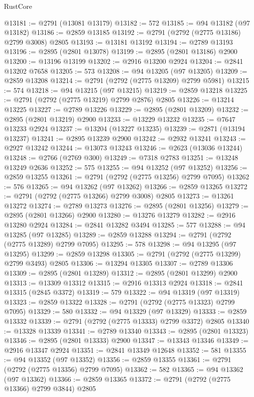 \begin{lexlean}{RustCore}
\begin{coremodule}
@13181 := @2791 (@13081 @13179)
@13182 := 572
@13185 := @94 @13182 (@97 @13182)
@13186 := @2859 @13185
@13192 := @2791 (@2792 (@2775 @13186) @2799 @3008) @2805
@13193 := @13181 @13192
@13194 := @2789 @13193
@13196 := @2895 (@2801 @13078)
@13199 := @2895 (@2801 @13186) @2900
@13200 := @13196 @13199
@13202 := @2916 @13200 @2924
@13204 := @2841 @13202 @7658
@13205 := 573
@13208 := @94 @13205 (@97 @13205)
@13209 := @2859 @13208
@13214 := @2791 (@2792 (@2775 @13209) @2799 @5981)
@13215 := 574
@13218 := @94 @13215 (@97 @13215)
@13219 := @2859 @13218
@13225 := @2791 (@2792 (@2775 @13219) @2799 @2876) @2805
@13226 := @13214 @13225
@13227 := @2789 @13226
@13229 := @2895 (@2801 @13209)
@13232 := @2895 (@2801 @13219) @2900
@13233 := @13229 @13232
@13235 := @7647 @13233 @2924
@13237 := @13204 (@13227 @13235)
@13239 := @2871 (@13194 @13237)
@13241 := @2895 @13239 @2900
@13242 := @2932 @13241
@13243 := @2927 @13242
@13244 := @13073 @13243
@13246 := @2623 (@13036 @13244)
@13248 := @2766 (@2769 @300)
@13249 := @7318 @2783
@13251 := @13248 @13249 @2636
@13252 := 575
@13255 := @94 @13252 (@97 @13252)
@13256 := @2859 @13255
@13261 := @2791 (@2792 (@2775 @13256) @2799 @7095)
@13262 := 576
@13265 := @94 @13262 (@97 @13262)
@13266 := @2859 @13265
@13272 := @2791 (@2792 (@2775 @13266) @2799 @3008) @2805
@13273 := @13261 @13272
@13274 := @2789 @13273
@13276 := @2895 (@2801 @13256)
@13279 := @2895 (@2801 @13266) @2900
@13280 := @13276 @13279
@13282 := @2916 @13280 @2924
@13284 := @2841 @13282 @3494
@13285 := 577
@13288 := @94 @13285 (@97 @13285)
@13289 := @2859 @13288
@13294 := @2791 (@2792 (@2775 @13289) @2799 @7095)
@13295 := 578
@13298 := @94 @13295 (@97 @13295)
@13299 := @2859 @13298
@13305 := @2791 (@2792 (@2775 @13299) @2799 @3493) @2805
@13306 := @13294 @13305
@13307 := @2789 @13306
@13309 := @2895 (@2801 @13289)
@13312 := @2895 (@2801 @13299) @2900
@13313 := @13309 @13312
@13315 := @2916 @13313 @2924
@13318 := @2841 @13315 (@2845 @3372)
@13319 := 579
@13322 := @94 @13319 (@97 @13319)
@13323 := @2859 @13322
@13328 := @2791 (@2792 (@2775 @13323) @2799 @7095)
@13329 := 580
@13332 := @94 @13329 (@97 @13329)
@13333 := @2859 @13332
@13339 := @2791 (@2792 (@2775 @13333) @2799 @3372) @2805
@13340 := @13328 @13339
@13341 := @2789 @13340
@13343 := @2895 (@2801 @13323)
@13346 := @2895 (@2801 @13333) @2900
@13347 := @13343 @13346
@13349 := @2916 @13347 @2924
@13351 := @2841 @13349 @12648
@13352 := 581
@13355 := @94 @13352 (@97 @13352)
@13356 := @2859 @13355
@13361 := @2791 (@2792 (@2775 @13356) @2799 @7095)
@13362 := 582
@13365 := @94 @13362 (@97 @13362)
@13366 := @2859 @13365
@13372 := @2791 (@2792 (@2775 @13366) @2799 @3844) @2805

\end{coremodule}
\end{lexlean}
